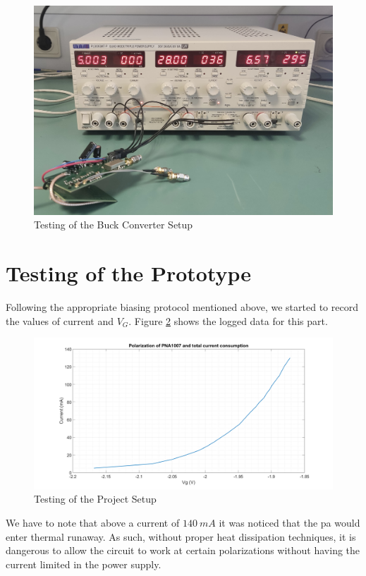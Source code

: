 \begin{figure}[H]
    \vspace*{0cm}
    \centering
    \includegraphics[width=0.7\linewidth]{figs/ch4_psuTesting.jpg}
    \caption{Testing of the Buck Converter Setup}
    \label{fig:ch4_psuTesting.jpg}
\end{figure}


\section{Testing of the Prototype}
\par Following the appropriate biasing protocol mentioned above, we started to record the values of current and $V_{G}$. Figure \ref{fig:ch4_npa1007Pol.png} shows the logged data for this part.

\begin{figure}[H]
    \vspace*{0cm}
    \centering
    \includegraphics[width=1\linewidth]{figs/ch4_npa1007Pol.png}
    \caption{Testing of the Project Setup}
    \label{fig:ch4_npa1007Pol.png}
\end{figure}

\par We have to note that above a current of $140 \:\si{mA}$ it was noticed that the \ac{pa} would enter thermal runaway. As such, without proper heat dissipation techniques, it is dangerous to allow the circuit to work at certain polarizations without having the current limited in the power supply.

